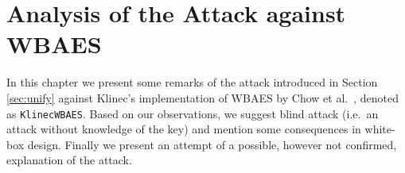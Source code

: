 \chapter{Analysis of the Attack against WBAES}
\label{chap:analysis}

In this chapter we present some remarks of the attack introduced in Section \ref{sec:unify} against Klinec's implementation \cite{klinec2013implementation} of WBAES by Chow et al.\ \cite{chow2002aes}, denoted as {\tt KlinecWBAES}. Based on our observations, we suggest blind attack (i.e.\ an attack without knowledge of the key) and mention some consequences in white-box design. %
Finally we present an attempt of a possible, however not confirmed, explanation of the attack.








